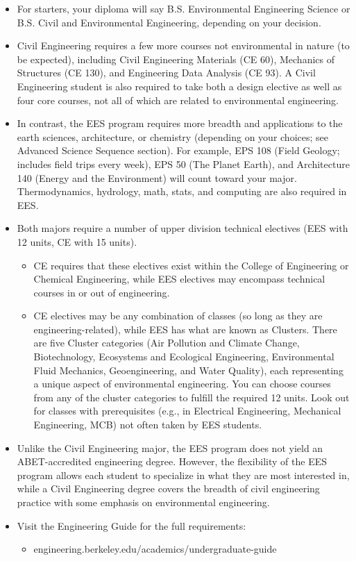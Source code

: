 \begin{itemize}
  \item For starters, your diploma will say B.S. Environmental Engineering Science or B.S. Civil and Environmental Engineering, depending on your decision.
  \item Civil Engineering requires a few more courses not environmental in nature (to be expected), including Civil Engineering Materials (CE 60), Mechanics of Structures (CE 130), and Engineering Data Analysis (CE 93). A Civil Engineering student is also required to take both a design elective as well as four core courses, not all of which are related to environmental engineering.
  \item In contrast, the EES program requires more breadth and applications to the earth sciences, architecture, or chemistry (depending on your choices; see Advanced Science Sequence section). For example, EPS 108 (Field Geology; includes field trips every week), EPS 50 (The Planet Earth), and Architecture 140 (Energy and the Environment) will count toward your major. Thermodynamics, hydrology, math, stats, and computing are also required in EES.
  \item Both majors require a number of upper division technical electives (EES with 12 units, CE with 15 units).
  \begin{itemize}
    \item CE requires that these electives exist within the College of Engineering or Chemical Engineering, while EES electives may encompass technical courses in or out of engineering.
    \item CE electives may be any combination of classes (so long as they are engineering-related), while EES has what are known as Clusters. There are five Cluster categories (Air Pollution and Climate Change, Biotechnology, Ecosystems and Ecological Engineering, Environmental Fluid Mechanics, Geoengineering, and Water Quality), each representing a unique aspect of environmental engineering.  You can choose courses from any of the cluster categories to fulfill the required 12 units. Look out for classes with prerequisites (e.g., in Electrical Engineering, Mechanical Engineering, MCB) not often taken by EES students. 
  \end{itemize}
  \item Unlike the Civil Engineering major, the EES program does not yield an ABET-accredited engineering degree. However, the flexibility of the EES program allows each student to specialize in what they are most interested in, while a Civil Engineering degree covers the breadth of civil engineering practice with some emphasis on environmental engineering.
  \item Visit the Engineering Guide for the full requirements:
  \begin{itemize}
    \item {\selectfont engineering.berkeley.edu/academics/undergraduate-guide}
  \end{itemize}
\end{itemize}

